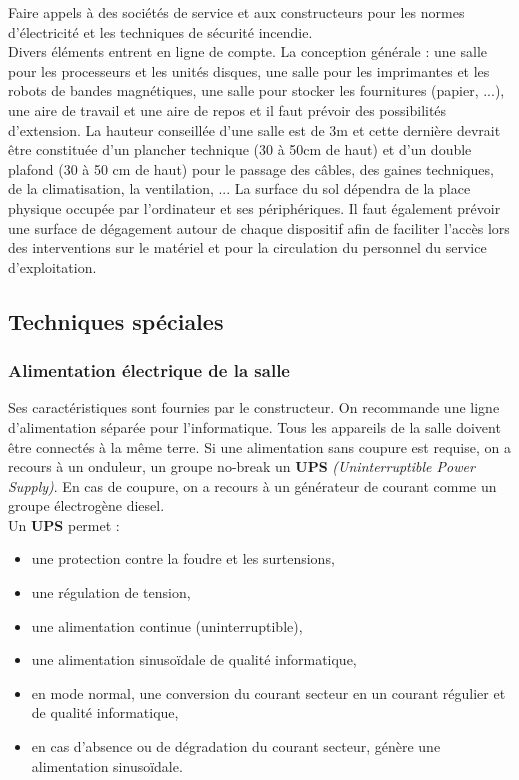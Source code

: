 \documentclass[10pt,a4paper,oneside,titlepage]{report}
\newcommand{\titre}[1]{\textcolor{title}{#1}}
\newcommand{\strong}[1]{\textbf{\titre{#1}}}
\begin{document}
\begin{sffamily}
Faire appels à des sociétés de service et aux constructeurs pour les normes d'électricité et les techniques de sécurité incendie.\\
Divers éléments entrent en ligne de compte. La conception générale : une salle pour les processeurs et les unités disques, une salle pour les imprimantes et les robots de bandes magnétiques, une salle pour stocker les fournitures (papier, ...), une 
aire de travail et une aire de repos et il faut prévoir des possibilités d'extension. La hauteur conseillée d'une salle est de 3m et cette dernière devrait \^etre constituée d'un plancher technique (30 à 50cm de haut) et d'un double plafond (30 à 50 
cm de haut) pour le passage des c\^ables, des gaines techniques, de la climatisation, la ventilation, ... La surface du sol dépendra de la place physique occupée par l'ordinateur et ses périphériques. Il faut également prévoir une surface de 
dégagement autour de chaque dispositif afin de faciliter l'accès lors des interventions sur le matériel et pour la circulation du personnel du service d'exploitation.

\subsection{Techniques spéciales}

\subsubsection{Alimentation électrique de la salle}

Ses caractéristiques sont fournies par le constructeur. On recommande une ligne d'alimentation séparée pour l'informatique. Tous les appareils de la salle doivent \^etre connectés à la m\^eme terre. Si une alimentation sans coupure est requise, on a 
recours à un onduleur, un groupe no-break un \strong{UPS} \textit{(Uninterruptible Power Supply)}. En cas de coupure, on a recours à un générateur de courant comme un groupe électrogène diesel.\\

Un \textbf{UPS} permet :\begin{itemize}
\item une protection contre la foudre et les surtensions,
\item une régulation de tension,
\item une alimentation continue (uninterruptible),
\item une alimentation sinusoïdale de qualité informatique,
\item en mode normal, une conversion du courant secteur en un courant régulier et de qualité informatique,
\item en cas d'absence ou de dégradation du courant secteur, génère une alimentation sinusoïdale.
\end{itemize}


\end{sffamily}
\end{document}
